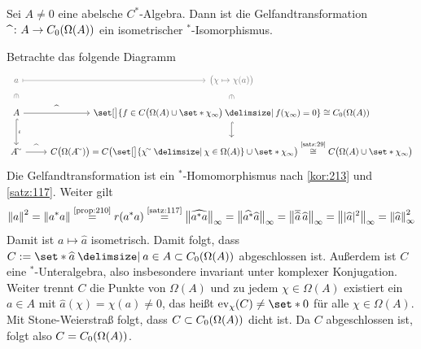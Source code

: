 \begin{satz}[name={Gelfand},label=satz16:gelfand]
	Sei $A \neq 0$ eine abelsche $C^*$-Algebra. 
	Dann ist die Gelfandtransformation $\widehat{\hspace{5pt}} \colon A \to C_0 \enbrace*{\Omega(A)}$ ein isometrischer ${}^*$-Isomorphismus.
\end{satz}
\begin{beweis}
	Betrachte das folgende Diagramm
	\[
		\begin{tikzcd}
			\color{dark_gray} a \rar[mapsto,dark_gray] \dar[phantom,"\in",sloped,dark_gray] & \color{dark_gray} \enbrace[\big]{\chi \mapsto \chi(a)} \dar[phantom,"\in",sloped,dark_gray] \\
			A \dar[hook,"\iota"] \rar["\widehat{\hspace{1ex}}"] 
			& \set[\big]{f \in C \enbrace[\big]{\Omega(A) \cup\set*{\chi_\infty}}\given f(\chi_\infty)=0} \cong C_0\enbrace*{\Omega(A)} \dar[hook] \\
			A^\simm \rar["\widehat{\hspace{1ex}}"] & C \enbrace[\big]{\Omega(A^\simm)} = C \enbrace[\big]{ \set[\big]{\chi^\simm \given \chi \in \Omega(A)} \cup \set*{\chi_\infty}} 
			\StackText{\ref{satz:29}}{\cong} C \enbrace[\big]{\Omega(A) \cup \set*{\chi_\infty}} 
		\end{tikzcd}
	\]
	Die Gelfandtransformation ist ein ${}^*$-Homomorphismus nach \autoref{kor:213} und \autoref{satz:117}. Weiter gilt 
	\[
		\norm*{a}^2 = \norm*{a^*a} \StackText{\ref{prop:210}}{=} r(a^*a) \StackText{\ref{satz:117}}{=} \norm[\big]{\widehat{a^*a}}_\infty = \norm*{\widehat{a^*} \widehat{a}}_\infty
		= \norm[\big]{\overline{\widehat{a}} \,\widehat{a}}_\infty = \norm[\big]{\abs{\widehat{a}}^2 }_\infty = \norm*{\widehat{a}}^2_\infty
	\]
	Damit ist $a \mapsto \widehat{a}$ isometrisch. 
	Damit folgt, dass $C := \set*{\widehat{a} \given a \in A} \subset C_0 \enbrace*{\Omega(A)}$ abgeschlossen ist. 
	Außerdem ist $C$ eine ${}^*$-Unteralgebra, also insbesondere invariant unter komplexer Konjugation. 
	Weiter trennt $C$ die Punkte von $\Omega(A)$ und zu jedem $\chi \in \Omega(A)$ existiert ein $a \in A$ mit $\widehat{a}(\chi)= \chi(a) \neq 0$, das heißt $\ev_\chi(C) \neq \set*{0}$ für alle $\chi \in \Omega(A)$. 
	Mit Stone-Weierstraß folgt, dass $C \subset C_0 \enbrace*{\Omega(A)}$ dicht ist. 
	Da $C$ abgeschlossen ist, folgt also $C=C_0 \enbrace*{\Omega(A)}$.
\end{beweis}

